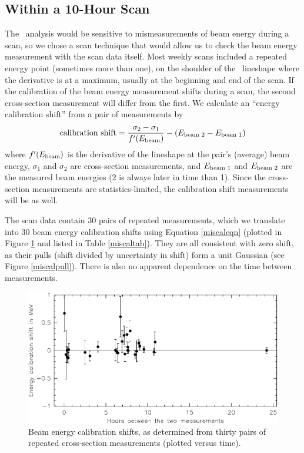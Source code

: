 \documentclass[aps,prd,preprint,superscriptaddress,tightenlines,nofootinbib,floatfix]{revtex4}
\begin{document}
\subsection{Within a 10-Hour Scan} \label{sec:tenhour}

The \gee\ analysis would be sensitive to mismeasurements of beam
energy during a scan, so we chose a scan technique that would allow us
to check the beam energy measurement with the scan data itself.  Most
weekly scans included a repeated energy point (sometimes more than
one), on the shoulder of the \ups\ lineshape where the derivative is
at a maximum, usually at the beginning and end of the scan.  If the
calibration of the beam energy measurement shifts during a scan, the
second cross-section measurement will differ from the first.  We
calculate an ``energy calibration shift'' from a pair of measurements
by
\begin{equation}
  \mbox{calibration shift} = \frac{\sigma_2 - \sigma_1}{f'(E_{\mbox{\scriptsize beam}})} - (E_{\mbox{\scriptsize beam 2}} - E_{\mbox{\scriptsize beam 1}})
  \label{miscaleqn}
\end{equation}
where $f'(E_{\mbox{\scriptsize beam}})$ is the derivative of the lineshape at the
pair's (average) beam energy, $\sigma_1$ and $\sigma_2$ are
cross-section measurements, and $E_{\mbox{\scriptsize beam 1}}$ and $E_{\mbox{\scriptsize beam
2}}$ are the measured beam energies (2 is always later in time than 1).
Since the cross-section measurements are statistics-limited, the
calibration shift measurements will be as well.

The scan data contain 30 pairs of repeated measurements, which we
translate into 30 beam energy calibration shifts using Equation
\ref{miscaleqn} (plotted in Figure \ref{miscalhours} and listed in
Table \ref{miscaltab}).  They are all consistent with zero shift, as
their pulls (shift divided by uncertainty in shift) form a unit
Gaussian (see Figure \ref{miscalpull}).  There is also no apparent
dependence on the time between measurements.

\begin{figure}[p]
  \begin{center}
    \includegraphics[width=0.9\linewidth]{miscal}
  \end{center}
  \caption{\label{miscalhours} Beam energy calibration shifts, as
    determined from thirty pairs of repeated cross-section
    measurements (plotted versus time).}
\end{figure}
\end{document}
